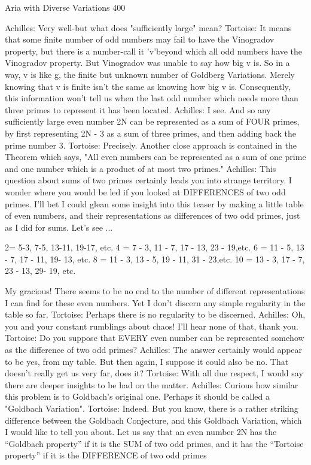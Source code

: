 Aria with Diverse Variations                                                             400

Achilles: Very well-but what does "sufficiently large" mean?
Tortoise: It means that some finite number of odd numbers may fail to have the
    Vinogradov property, but there is a number-call it 'v'beyond which all odd numbers
    have the Vinogradov property. But Vinogradov was unable to say how big v is. So in
    a way, v is like g, the finite but unknown number of Goldberg Variations. Merely
    knowing that v is finite isn't the same as knowing how big v is. Consequently, this
    information won't tell us when the last odd number which needs more than three
    primes to represent it has been located.
Achilles: I see. And so any sufficiently large even number 2N can be represented as a
    sum of FOUR primes, by first representing 2N - 3 as a sum of three primes, and then
    adding back the prime number 3.
Tortoise: Precisely. Another close approach is contained in the Theorem which says, "All
    even numbers can be represented as a sum of one prime and one number which is a
    product of at most two primes."
Achilles: This question about sums of two primes certainly leads you into strange
    territory. I wonder where you would be led if you looked at DIFFERENCES of two
    odd primes. I'll bet I could glean some insight into this teaser by making a little table
    of even numbers, and their representations as differences of two odd primes, just as I
    did for sums. Let's see ...

         2= 5-3,        7-5,          13-11,          19-17, etc.
         4 = 7 - 3,     11 - 7,       17 - 13,        23 - 19,etc.
         6 = 11 - 5,    13 - 7,       17 - 11,        19- 13, etc.
         8 = 11 - 3,    13 - 5,       19 - 11,        31 - 23,etc.
         10 = 13 - 3,   17 - 7,       23 - 13,        29- 19, etc.

My gracious! There seems to be no end to the number of different representations I can
    find for these even numbers. Yet I don't discern any simple regularity in the table so
    far.
Tortoise: Perhaps there is no regularity to be discerned.
Achilles: Oh, you and your constant rumblings about chaos! I'll hear none of that, thank
    you.
Tortoise: Do you suppose that EVERY even number can be represented somehow as the
    difference of two odd primes?
Achilles: The answer certainly would appear to be yes, from my table. But then again, I
    suppose it could also be no. That doesn't really get us very far, does it?
Tortoise: With all due respect, I would say there are deeper insights to be had on the
    matter.
Achilles: Curious how similar this problem is to Goldbach's original one. Perhaps it
    should be called a "Goldbach Variation".
Tortoise: Indeed. But you know, there is a rather striking difference between the
    Goldbach Conjecture, and this Goldbach Variation, which I would like to tell you
    about. Let us say that an even number 2N has the “Goldbach property” if it is the
    SUM of two odd primes, and it has the “Tortoise property” if it is the DIFFERENCE
    of two odd primes

